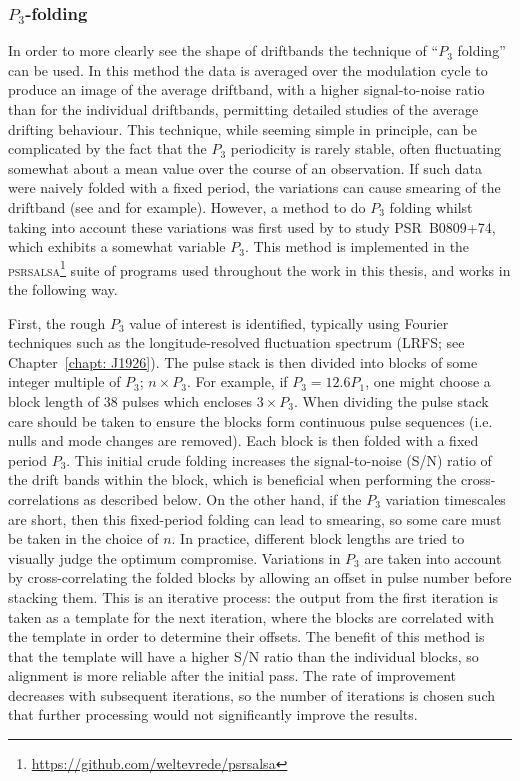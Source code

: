 \subsubsection{$P_3$-folding}
\label{sec: intro - emission models - single pulse phenomena - P3 folding}

In order to more clearly see the shape of driftbands the technique of ``$P_3$ folding'' can be used. In this method the data is averaged over the modulation cycle to produce an image of the average driftband, with a higher signal-to-noise ratio than for the individual driftbands, permitting detailed studies of the average drifting behaviour. This technique, while seeming simple in principle, can be complicated by the fact that the $P_3$ periodicity is rarely stable, often fluctuating somewhat about a mean value over the course of an observation. If such data were naively folded with a fixed period, the variations can cause smearing of the driftband (see \citealt{DRxx2001} and \citealt{LKR+2002} for example). However, a method to do $P_3$ folding whilst taking into account these variations was first used by \citet{HSW+2013} to study PSR~B0809+74, which exhibits a somewhat variable $P_3$. This method is implemented in the \textsc{psrsalsa}\footnote{\url{https://github.com/weltevrede/psrsalsa}} suite of programs \citep{Wxxx2016} used throughout the work in this thesis, and works in the following way.

First, the rough $P_3$ value of interest is identified, typically using Fourier techniques such as the longitude-resolved fluctuation spectrum (LRFS; see Chapter~\ref{chapt: J1926}). The pulse stack is then divided into blocks of some integer multiple of $P_3$; $n\times P_3$. For example, if $P_3 = 12.6 P_1$, one might choose a block length of 38 pulses which encloses $ 3\times P_3$. When dividing the pulse stack care should be taken to ensure the blocks form continuous pulse sequences (i.e. nulls and mode changes are removed). Each block is then folded with a fixed period $P_3$. This initial crude folding increases the signal-to-noise (S/N) ratio of the drift bands within the block, which is beneficial when performing the cross-correlations as described below. On the other hand, if the $P_3$ variation timescales are short, then this fixed-period folding can lead to smearing, so some care must be taken in the choice of $n$. In practice, different block lengths are tried to visually judge the optimum compromise. Variations in $P_3$ are taken into account by cross-correlating the folded blocks by allowing an offset in pulse number before stacking them. This is an iterative process: the output from the first iteration is taken as a template for the next iteration, where the blocks are correlated with the template in order to determine their offsets. The benefit of this method is that the template will have a higher S/N ratio than the individual blocks, so alignment is more reliable after the initial pass. The rate of improvement decreases with subsequent iterations, so the number of iterations is chosen such that further processing would not significantly improve the results.


